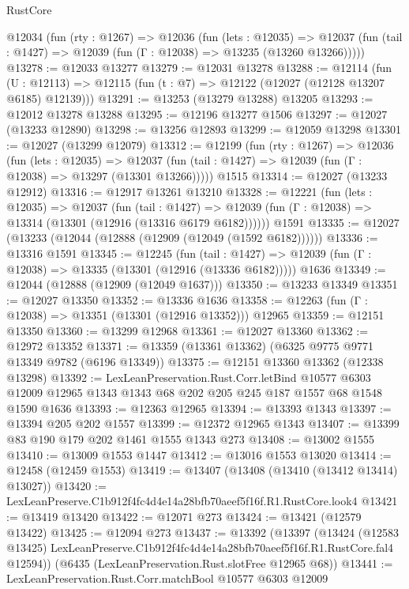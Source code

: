 \begin{lexlean}{RustCore}
\begin{coremodule}
  @12034
    (fun (rty : @1267) =>
    @12036
      (fun (lets : @12035) =>
      @12037 (fun (tail : @1427) => @12039 (fun (Γ : @12038) => @13235 (@13260 @13266)))))
@13278 := @12033 @13277
@13279 := @12031 @13278
@13288 := @12114
    (fun (U : @12113) => @12115 (fun (t : @7) => @12122 (@12027 (@12128 @13207 @6185) @12139)))
@13291 := @13253 (@13279 @13288) @13205
@13293 := @12012 @13278 @13288
@13295 := @12196 @13277 @1506
@13297 := @12027 (@13233 @12890)
@13298 := @13256 @12893
@13299 := @12059 @13298
@13301 := @12027 (@13299 @12079)
@13312 := @12199
    (fun (rty : @1267) =>
    @12036
      (fun (lets : @12035) =>
      @12037 (fun (tail : @1427) => @12039 (fun (Γ : @12038) => @13297 (@13301 @13266)))))
    @1515
@13314 := @12027 (@13233 @12912)
@13316 := @12917 @13261 @13210
@13328 := @12221
    (fun (lets : @12035) =>
    @12037
      (fun (tail : @1427) =>
      @12039 (fun (Γ : @12038) => @13314 (@13301 (@12916 (@13316 @6179 @6182))))))
    @1591
@13335 := @12027 (@13233 (@12044 (@12888 (@12909 (@12049 (@1592 @6182))))))
@13336 := @13316 @1591
@13345 := @12245
    (fun (tail : @1427) => @12039 (fun (Γ : @12038) => @13335 (@13301 (@12916 (@13336 @6182)))))
    @1636
@13349 := @12044 (@12888 (@12909 (@12049 @1637)))
@13350 := @13233 @13349
@13351 := @12027 @13350
@13352 := @13336 @1636
@13358 := @12263 (fun (Γ : @12038) => @13351 (@13301 (@12916 @13352))) @12965
@13359 := @12151 @13350
@13360 := @13299 @12968
@13361 := @12027 @13360
@13362 := @12972 @13352
@13371 := @13359 (@13361 @13362) (@6325 @9775 @9771 @13349 @9782 (@6196 @13349))
@13375 := @12151 @13360 @13362 (@12338 @13298)
@13392 := LexLeanPreservation.Rust.Corr.letBind
    @10577
    @6303
    @12009
    @12965
    @1343
    @1343
    @68
    @202
    @205
    @245
    @187
    @1557
    @68
    @1548
    @1590
    @1636
@13393 := @12363 @12965
@13394 := @13393 @1343
@13397 := @13394 @205 @202 @1557
@13399 := @12372 @12965 @1343
@13407 := @13399 @83 @190 @179 @202 @1461 @1555 @1343 @273
@13408 := @13002 @1555
@13410 := @13009 @1553 @1447
@13412 := @13016 @1553 @13020
@13414 := @12458 (@12459 @1553)
@13419 := @13407 (@13408 (@13410 (@13412 @13414) @13027))
@13420 := LexLeanPreserve.C1b912f4fc4d4e14a28bfb70aeef5f16f.R1.RustCore.look4
@13421 := @13419 @13420
@13422 := @12071 @273
@13424 := @13421 (@12579 @13422)
@13425 := @12094 @273
@13437 := @13392
    (@13397
      (@13424
        (@12583 @13425)
        LexLeanPreserve.C1b912f4fc4d4e14a28bfb70aeef5f16f.R1.RustCore.fal4
        @12594))
    (@6435 (LexLeanPreservation.Rust.slotFree @12965 @68))
@13441 := LexLeanPreservation.Rust.Corr.matchBool @10577 @6303 @12009

\end{coremodule}
\end{lexlean}
